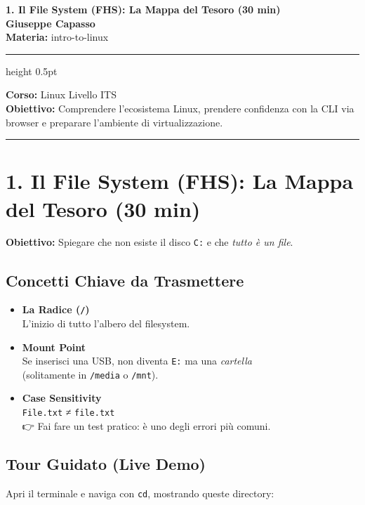 \documentclass[11pt,a4paper]{article}
\newcommand{\proposaltitle}[1]{
    \begin{center}
        \vspace*{0.1cm}
        {\LARGE \bfseries \color{blue} #1} \\[1.5ex]
        {\large \textbf{Giuseppe Capasso}} \\[1ex]
                \small{
            \vspace{0.1cm}
            \textbf{Materia:} intro-to-linux\\
        }
            \end{center}
    \vspace{0.3cm}
    \hrule height 0.5pt
    \vspace{0.5cm}
}
\begin{document}
\proposaltitle{1. Il File System (FHS): La Mappa del Tesoro (30 min)}

\textbf{Corso:} Linux Livello ITS\\
\textbf{Obiettivo:} Comprendere l'ecosistema Linux, prendere confidenza
con la CLI via browser e preparare l'ambiente di virtualizzazione.

\begin{center}\rule{0.5\linewidth}{0.5pt}\end{center}

\section{1. Il File System (FHS): La Mappa del Tesoro (30
min)}\label{il-file-system-fhs-la-mappa-del-tesoro-30-min}

\textbf{Obiettivo:} Spiegare che non esiste il disco \texttt{C:} e che
\emph{tutto è un file}.

\subsection{Concetti Chiave da
Trasmettere}\label{concetti-chiave-da-trasmettere}

\begin{itemize}
\item
  \textbf{La Radice (\texttt{/})}\\
  L'inizio di tutto l'albero del filesystem.
\item
  \textbf{Mount Point}\\
  Se inserisci una USB, non diventa \texttt{E:} ma una \emph{cartella}\\
  (solitamente in \texttt{/media} o \texttt{/mnt}).
\item
  \textbf{Case Sensitivity}\\
  \texttt{File.txt} ≠ \texttt{file.txt}\\
  👉 Fai fare un test pratico: è uno degli errori più comuni.
\end{itemize}

\subsection{Tour Guidato (Live Demo)}\label{tour-guidato-live-demo}

Apri il terminale e naviga con \texttt{cd}, mostrando queste directory:
\end{document}
